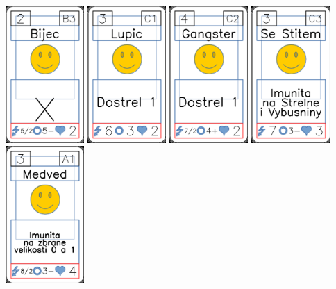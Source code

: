 \documentclass[a4paper]{article}
\begin{document}
	\includegraphics[width=3.0cm]{img-3_5}
	\includegraphics[width=3.0cm]{img-3_6}
	\includegraphics[width=3.0cm]{img-3_7}
	\includegraphics[width=3.0cm]{img-3_8}
	\includegraphics[width=3.0cm]{img-3_9}
\end{document}

